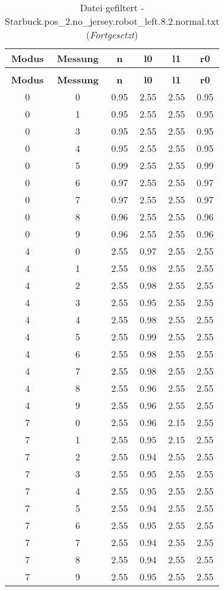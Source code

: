 \clearpage{}
\begin{longtable}{|c|c||c||c|c||c|}
	\caption{Datei gefiltert - Starbuck.pos\_2.no\_jersey.robot\_left.8.2.normal.txt} \label{tab:Starbuck.pos-2.no-jersey.robot-left.8.2.normal.txt} \\ \hline
	\textbf{Modus} & \textbf{Messung} & \textbf{n} & \textbf{l0} & \textbf{l1} & \textbf{r0}\\ \hline
	\endfirsthead
	\caption[]{Datei gefiltert - Starbuck.pos\_2.no\_jersey.robot\_left.8.2.normal.txt (\emph{Fortgesetzt})} \\ \hline
	\textbf{Modus} & \textbf{Messung} & \textbf{n} & \textbf{l0} & \textbf{l1} & \textbf{r0}\\ \hline
	\endhead
	0 & 0 & 0.95 & 2.55 & 2.55 & 0.95 \\ \hline
	0 & 1 & 0.95 & 2.55 & 2.55 & 0.95 \\ \hline
	0 & 3 & 0.95 & 2.55 & 2.55 & 0.95 \\ \hline
	0 & 4 & 0.95 & 2.55 & 2.55 & 0.95 \\ \hline
	0 & 5 & 0.99 & 2.55 & 2.55 & 0.99 \\ \hline
	0 & 6 & 0.97 & 2.55 & 2.55 & 0.97 \\ \hline
	0 & 7 & 0.97 & 2.55 & 2.55 & 0.97 \\ \hline
	0 & 8 & 0.96 & 2.55 & 2.55 & 0.96 \\ \hline
	0 & 9 & 0.96 & 2.55 & 2.55 & 0.96 \\ \hline
	4 & 0 & 2.55 & 0.97 & 2.55 & 2.55 \\ \hline
	4 & 1 & 2.55 & 0.98 & 2.55 & 2.55 \\ \hline
	4 & 2 & 2.55 & 0.98 & 2.55 & 2.55 \\ \hline
	4 & 3 & 2.55 & 0.95 & 2.55 & 2.55 \\ \hline
	4 & 4 & 2.55 & 0.98 & 2.55 & 2.55 \\ \hline
	4 & 5 & 2.55 & 0.99 & 2.55 & 2.55 \\ \hline
	4 & 6 & 2.55 & 0.98 & 2.55 & 2.55 \\ \hline
	4 & 7 & 2.55 & 0.98 & 2.55 & 2.55 \\ \hline
	4 & 8 & 2.55 & 0.96 & 2.55 & 2.55 \\ \hline
	4 & 9 & 2.55 & 0.96 & 2.55 & 2.55 \\ \hline
	7 & 0 & 2.55 & 0.96 & 2.15 & 2.55 \\ \hline
	7 & 1 & 2.55 & 0.95 & 2.15 & 2.55 \\ \hline
	7 & 2 & 2.55 & 0.94 & 2.55 & 2.55 \\ \hline
	7 & 3 & 2.55 & 0.95 & 2.55 & 2.55 \\ \hline
	7 & 4 & 2.55 & 0.95 & 2.55 & 2.55 \\ \hline
	7 & 5 & 2.55 & 0.94 & 2.55 & 2.55 \\ \hline
	7 & 6 & 2.55 & 0.95 & 2.55 & 2.55 \\ \hline
	7 & 7 & 2.55 & 0.94 & 2.55 & 2.55 \\ \hline
	7 & 8 & 2.55 & 0.94 & 2.55 & 2.55 \\ \hline
	7 & 9 & 2.55 & 0.95 & 2.55 & 2.55 \\ \hline
\end{longtable}
